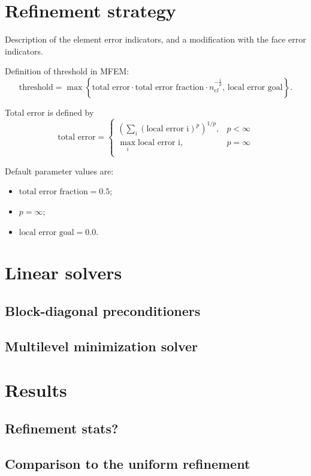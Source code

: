\documentclass[a4paper,12pt]{amsart}
\numberwithin{equation}{section}
\begin{document}
\section{Refinement strategy}
Description of the element error indicators, and a modification with the face error indicators.

Definition of threshold in MFEM:
$$
\mbox{threshold} = \max \left\lbrace \mbox{total error} \cdot \mbox{total error fraction} \cdot n_{el}^{-\frac{1}{p}}, \, \mbox{local error goal} \right\rbrace.
$$

Total error is defined by
$$
\mbox{total error}  = 
\left\{ 
\begin{array}{lc}
\left( \sum_i \left(\mbox{local error i}\right)^p \right)^{1/p}, & p < \infty \\
\max_i \mbox{local error i}, & p = \infty \\
\end{array}
\right.
$$

Default parameter values are:
\begin{itemize}
	\item $\mbox{total error fraction} = 0.5$;
	\item $p = \infty$;
	\item $\mbox{local error goal} = 0.0$.
\end{itemize}

\section{Linear solvers}

\subsection{Block-diagonal preconditioners}

\subsection{Multilevel minimization solver}

\section{Results}

\subsection{Refinement stats?}

\subsection{Comparison to the uniform refinement}
\end{document}
